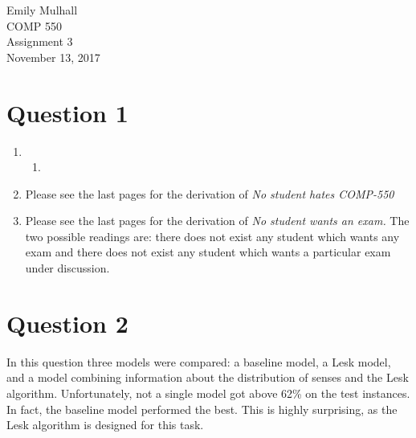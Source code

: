 \documentclass{article}
\begin{document}
\noindent Emily Mulhall\\
COMP 550\\
Assignment 3\\
November 13, 2017\\

\section*{Question 1}
\begin{enumerate}
\item 
	\begin{enumerate}
		\item
	\end{enumerate}
\item Please see the last pages for the derivation of \textit{No student hates COMP-550}
\item Please see the last pages for the derivation of \textit{No student wants an exam.}  The two possible readings are: there does not exist any student which wants any exam and there does not exist any student which wants a particular exam under discussion.
\end{enumerate}

\section*{Question 2}
In this question three models were compared: a baseline model, a Lesk model, and a model combining information about the distribution of senses and the Lesk algorithm.  Unfortunately, not a single model got above 62\% on the test instances. In fact, the baseline model performed the best.  This is highly surprising, as the Lesk algorithm is designed for this task.
\end{document}
